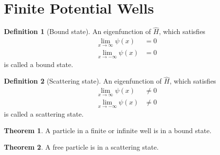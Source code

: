\documentclass[titlepage, fleqn, a4paper, 12pt, twoside]{article}
\theoremstyle{definition}
\newtheorem{definition}{Definition}
\theoremstyle{theorem}
\newtheorem{theorem}{Theorem}
\begin{document}
\section{Finite Potential Wells}

\begin{definition}[Bound state]
	An eigenfunction of $\hat{H}$, which satisfies
	\begin{align*}
		\lim\limits_{x \to \infty} \psi(x) &= 0\\
		\lim\limits_{x \to -\infty} \psi(x) &= 0
	\end{align*}
	is called a bound state.
\end{definition}

\begin{definition}[Scattering state]
	An eigenfunction of $\hat{H}$, which satisfies
	\begin{align*}
		\lim\limits_{x \to \infty} \psi(x) &\neq 0\\
		\lim\limits_{x \to -\infty} \psi(x) &\neq 0
	\end{align*}
	is called a scattering state.
\end{definition}

\begin{theorem}
	A particle in a finite or infinite well is in a bound state.
\end{theorem}

\begin{theorem}
	A free particle is in a scattering state.
\end{theorem}
\end{document}
